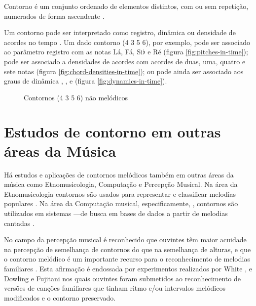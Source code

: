 Contorno é um conjunto ordenado de elementos distintos, com ou sem
repetição, numerados de forma ascendente
\cite[p. 206]{morris93:directions}.

Um contorno pode ser interpretado como registro, dinâmica ou densidade
de acordes no tempo \cite[p. 206]{morris93:directions}
\cite[p. 22]{clifford95:contour}. Um dado contorno (4 3 5 6), por
exemplo, pode ser associado ao parâmetro registro com as notas Lá, Fá,
Si$\flat$ e Ré (figura \ref{fig:pitches-in-time}); pode ser associado
a densidades de acordes com acordes de duas, uma, quatro e sete notas
(figura \ref{fig:chord-densities-in-time}); ou pode ainda ser
associado aos graus de dinâmica , ,  e
 (figura \ref{fig:dynamics-in-time}).

\begin{figure}
  \centering

  \caption{Contornos (4 3 5 6) não melódicos}
  \label{fig:non-melodic-contours}
\end{figure}

\section{Estudos de contorno em outras áreas da Música}
\label{sec:estudos-de-contorno}

Há estudos e aplicações de contornos melódicos também em outras áreas
da música como Etnomusicologia, Computação e Percepção Musical. Na
área da Etnomusicologia contornos são usados para representar e
classificar melodias populares \cite{adams76:melodic}. Na área da
Computação musical, especificamente, , contornos são utilizados em sistemas ---de busca em bases de dados a partir de melodias cantadas
\cite{ghias.ea95:query}.

No campo da percepção musical é reconhecido que ouvintes têm maior
acuidade na percepção de semelhança de contornos do que na semelhança
de alturas, e que o contorno melódico é um importante recurso para o
reconhecimento de melodias familiares \cite[p. 226,
136]{dowling.ea86:music}. Esta afirmação é endossada por experimentos
realizados por White \cite{white60:recognition}, e Dowling e Fujitani
\cite{dowling.ea71:contour} nos quais ouvintes foram submetidos ao
reconhecimento de versões de canções familiares que tinham ritmo e/ou
intervalos melódicos modificados e o contorno preservado.

